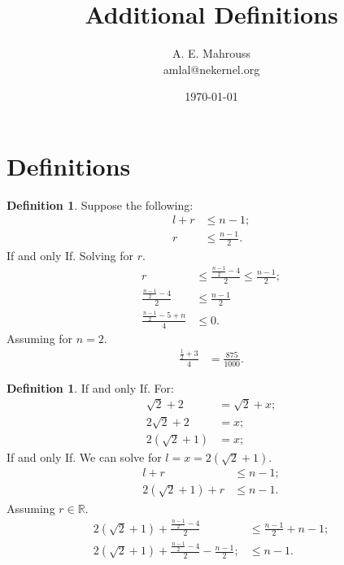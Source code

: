 \documentclass[10pt, twocolumn]{article}
\title{%
	\vspace{-1.5em}%
	\large\textbf{Additional Definitions}%
}
\author{A. E. Mahrouss\\amlal@nekernel.org}
\date{\today}
\theoremstyle{plain}
\theoremstyle{definition}
\newtheorem{definition}[theorem]{Definition}
\theoremstyle{remark}
\begin{document}
	
	\twocolumn[{%
		\maketitle
		\vspace{-0.5em}
		\vspace{0.8em}
		\rule{\linewidth}{0.4pt}
		\vspace{1em}
	}]
	
	\section{Definitions}
	
	\begin{definition}
		Suppose the following:
		\begin{align*}
			l + r &\leq n - 1;\\
			r &\leq \frac{n - 1}{2}.
		\end{align*}
		If and only If. Solving for $r.$
		\begin{align*}
			r &\leq \frac{\frac{n - 1}{2} - 4}{2} \leq \frac{n - 1}{2};\\
			\frac{\frac{n - 1}{2} - 4}{2} &\leq \frac{n - 1}{2}\\
			\frac{\frac{n - 1}{2} - 5 + n}{4} &\leq 0.
		\end{align*}
		Assuming for $n=2.$
		\begin{align*}
			\frac{\frac{1}{2} +3}{4} &= \frac{875}{1000}.
		\end{align*}
	\end{definition}
	
	\begin{definition}
		If and only If. For:
		\begin{align*}
			\sqrt{2}+2&=\sqrt{2} + x;\\
			2\sqrt{2}+2 &=x;\\
			2(\sqrt{2} + 1) &= x;
		\end{align*}
		If and only If. We can solve for $l=x=2(\sqrt{2} + 1).$
		\begin{align*}
			l + r &\leq n - 1;\\
			2(\sqrt{2} + 1) + r &\leq n - 1.
		\end{align*}
		Assuming $r \in \mathbb{R}.$
		\begin{align*}
			2(\sqrt{2} + 1) + \frac{\frac{n - 1}{2} - 4}{2}  &\leq \frac{n - 1}{2} + n - 1;\\
			2(\sqrt{2} + 1) + \frac{\frac{n - 1}{2} - 4}{2} - \frac{n - 1}{2}; &\leq n - 1.
		\end{align*}
	\end{definition}
	
	\nocite{*}
	
	
	
\end{document}

